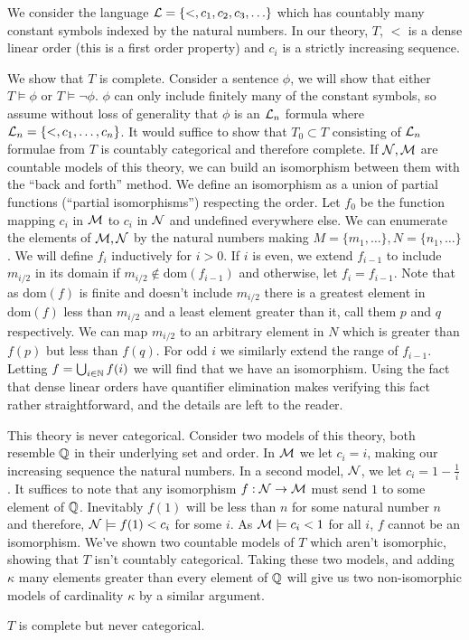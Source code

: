 \begin{example}\label{example_categoricity_sequence}
We consider the language \(\mathcal{L} = \{<, c_1, c_2, c_3, \ldots\}\) which has countably many constant symbols indexed by the natural numbers. 
In our theory, \(T\), \(<\) is a dense linear order (this is a first order property) and \(c_i\) is a strictly increasing sequence. 

We show that \(T\) is complete.
Consider a sentence \(\phi\), we will show that either \(T \models \phi\) or \(T \models \neg \phi\). 
\(\phi\) can only include finitely many of the constant symbols, so assume without loss of generality that \(\phi\) is an \(\mathcal{L}_n\) formula where \(\mathcal{L}_n = \{<, c_1, \ldots, c_n\}\).
It would suffice to show that \(T_0 \subset T\) consisting of \(\mathcal{L}_n\) formulae from \(T\) is countably categorical and therefore complete. 
If \(\mathcal{N}, \mathcal{M}\) are countable models of this theory, we can build an isomorphism between them with the ``back and forth'' method. 
We define an isomorphism as a union of partial functions (``partial isomorphisms'') respecting the order. 
Let \(f_0\) be the function mapping \(c_i\) in \(\mathcal{M}\) to \(c_i\) in \(\mathcal{N}\) and undefined everywhere else. 
We can enumerate the elements of \(\mathcal{M}, \mathcal{N}\) by the natural numbers making \(M = \{m_1, \ldots\}, N = \{n_1, \ldots\}\). 
We will define \(f_i\) inductively for \(i > 0\). 
If \(i\) is even, we extend \(f_{i-1}\) to include \(m_{i/2}\) in its domain if \(m_{i/2} \notin \text{dom}(f_{i-1})\) and otherwise, let \(f_i = f_{i-1}\).
Note that as \(\text{dom}(f)\) is finite and doesn't include \(m_{i/2}\) there is a greatest element in \(\text{dom}(f)\) less than \(m_{i/2}\) and a least element greater than it, call them \(p\) and \(q\) respectively.
We can map \(m_{i/2}\) to an arbitrary element in \(N\) which is greater than \(f(p)\) but less than \(f(q)\). 
For odd \(i\) we similarly extend the range of \(f_{i-1}\). 
Letting \(f = \bigcup_{i \in \mathbb{N}}f(i)\) we will find that we have an isomorphism. 
Using the fact that dense linear orders have quantifier elimination %
makes verifying this fact rather straightforward, and the details are left to the reader.
 
This theory is never categorical.
Consider two models of this theory, both resemble \(\mathbb{Q}\) in their underlying set and order.
In \(\mathcal{M}\) we let \(c_i = i\), making our increasing sequence the natural numbers. 
In a second model, \(\mathcal{N}\), we let \(c_i = 1 - \frac{1}{i}\).
It suffices to note that any isomorphism \(f: \mathcal{N} \to \mathcal{M}\) must send \(1\) to some element of \(\mathbb{Q}\).
Inevitably \(f(1)\) will be less than \(n\) for some natural number \(n\) and therefore, \(\mathcal{N} \models f(1) < c_i\) for some \(i\).
As \(\mathcal{M} \models c_i < 1\) for all \(i\), \(f\) cannot be an isomorphism. 
We've shown two countable models of \(T\) which aren't isomorphic, showing that \(T\) isn't countably categorical. 
Taking these two models, and adding \(\kappa\) many elements greater than every element of \(\mathbb{Q}\) will give us two non-isomorphic models of cardinality \(\kappa\) by a similar argument. 

\(T\) is complete but never categorical. 
\end{example}

